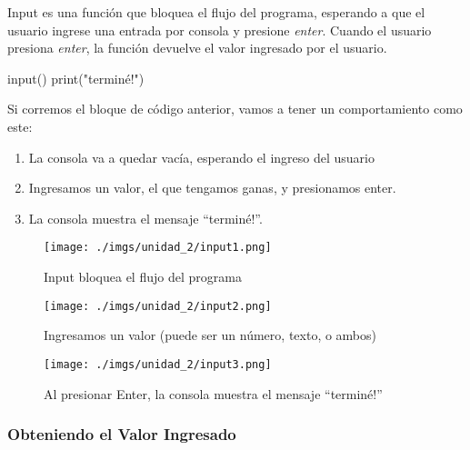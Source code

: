 \documentclass[
  letterpaper,
  DIV=11,
  numbers=noendperiod]{scrreprt}
\newenvironment{Shaded}{\begin{snugshade}}{\end{snugshade}}
\newcommand{\BuiltInTok}[1]{\textcolor[rgb]{0.00,0.23,0.31}{#1}}
\newcommand{\NormalTok}[1]{\textcolor[rgb]{0.00,0.23,0.31}{#1}}
\newcommand{\StringTok}[1]{\textcolor[rgb]{0.13,0.47,0.30}{#1}}
\providecommand{\tightlist}{%
  \setlength{\itemsep}{0pt}\setlength{\parskip}{0pt}}\usepackage{longtable,booktabs,array}
\begin{document}
Input es una función que bloquea el flujo del programa, esperando a que
el usuario ingrese una entrada por consola y presione \emph{enter}.
Cuando el usuario presiona \emph{enter}, la función devuelve el valor
ingresado por el usuario.\\

\begin{Shaded}
\begin{Highlighting}[]
\BuiltInTok{input}\NormalTok{()}
\BuiltInTok{print}\NormalTok{(}\StringTok{"terminé!"}\NormalTok{)}
\end{Highlighting}
\end{Shaded}

Si corremos el bloque de código anterior, vamos a tener un
comportamiento como este:

\begin{enumerate}
\def\labelenumi{\arabic{enumi}.}
\tightlist
\item
  La consola va a quedar vacía, esperando el ingreso del usuario
\item
  Ingresamos un valor, el que tengamos ganas, y presionamos enter.
\item
  La consola muestra el mensaje ``terminé!''.
\end{enumerate}

\begin{figure}[H]

{\centering \texttt{[image: ./imgs/unidad\_2/input1.png]}

}

\caption{Input bloquea el flujo del programa}

\end{figure}%
\begin{figure}[H]

{\centering \texttt{[image: ./imgs/unidad\_2/input2.png]}

}

\caption{Ingresamos un valor (puede ser un número, texto, o ambos)}

\end{figure}%
\begin{figure}[H]

{\centering \texttt{[image: ./imgs/unidad\_2/input3.png]}

}

\caption{Al presionar Enter, la consola muestra el mensaje ``terminé!''}

\end{figure}%

\subsubsection{Obteniendo el Valor
Ingresado}\label{obteniendo-el-valor-ingresado}
\end{document}
